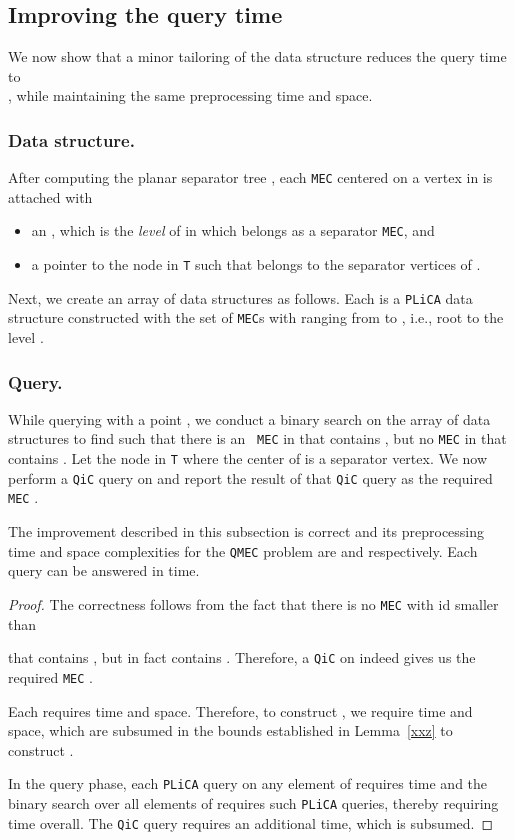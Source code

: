 \documentclass[12pt]{llncs}
\begin{document}
\subsection{Improving the query time}
We now show that a minor tailoring of the data structure reduces 
the query time to\\
 , while maintaining the same preprocessing 
time and space.

\subsubsection{Data structure.}
After computing the planar separator tree , each {\tt MEC}  centered on a vertex in  is 
attached with 
\begin{itemize}
\item an , which is the {\it level} of  in which  
belongs as a separator {\tt MEC}, and
\item a pointer to the node  in {\tt T} such that  belongs to the separator 
vertices of 
.
\end{itemize}
 Next, we create an array  of  data structures as follows. Each 
  is a {\tt PLiCA} data structure constructed 
with the set of {\tt MEC}s with  ranging from 
 to , i.e., root to the level .   

\subsubsection{Query.}
While querying with a point , we conduct a binary search on the array  
of 
data structures to find  such that there is an {\tt 
MEC}  in  that contains , but no {\tt MEC} in  
that 
contains . Let  the node in {\tt T} where  the center of  is a separator vertex. We now perform a {\tt QiC} query on  and 
report the result of that {\tt QiC} query as the required {\tt MEC} .
\begin{theorem}
The improvement described in this subsection is correct and its preprocessing time 
and 
space complexities for the {\tt QMEC} problem are  
 and   
respectively. Each query can be answered in  time.
\end{theorem}
\begin{proof}
The correctness follows from the fact that there is no {\tt MEC} with id smaller than 
 
that contains , but  in fact contains . Therefore, 
a {\tt QiC} on  indeed gives us the required {\tt MEC} .

Each  requires  time and  space. Therefore, to 
construct 
, we require  time and  space, which are subsumed in the bounds established in Lemma~\ref{xxz} to 
construct .

In the query phase, each {\tt PLiCA} query on any element of  requires 
 time and the binary search over all elements of  requires  such {\tt PLiCA} queries, thereby requiring  time overall. The {\tt QiC} query requires an 
additional  time, which is subsumed. 
\end{proof}
\end{document}
